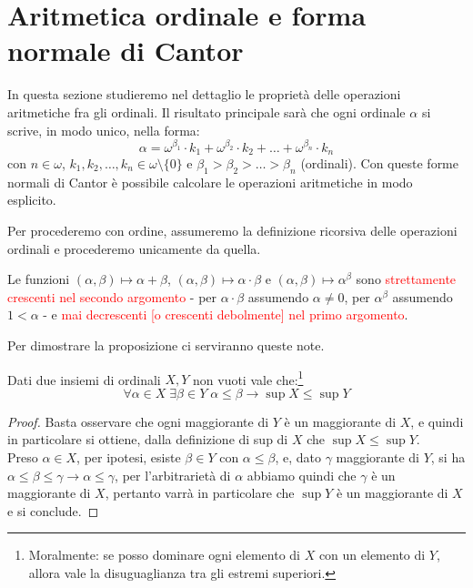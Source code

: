 \section{Aritmetica ordinale e forma normale di Cantor}
In questa sezione studieremo nel dettaglio le proprietà delle operazioni aritmetiche fra gli ordinali. Il risultato principale sarà che ogni ordinale $\alpha$ si scrive, in modo unico, nella forma:
\[ \alpha = \omega^{\beta_1}\cdot k_1 + \omega^{\beta_2}\cdot k_2 + \ldots + \omega^{\beta_n}\cdot k_n
	\]
con $n \in \omega$, $k_1,k_2,\ldots,k_n \in \omega\setminus\{0\}$ e $\beta_1 > \beta_2 > \ldots > \beta_n$ (ordinali). Con queste forme normali di Cantor è possibile calcolare le operazioni aritmetiche in modo esplicito.

\begin{note}
	Per procederemo con ordine, assumeremo la definizione ricorsiva delle operazioni ordinali e procederemo unicamente da quella.
\end{note}

\begin{proposition}
	Le funzioni $(\alpha,\beta)\mapsto \alpha + \beta$, $(\alpha,\beta) \mapsto \alpha \cdot \beta$ e $(\alpha,\beta) \mapsto \alpha^\beta$ sono \textcolor{red}{strettamente crescenti nel secondo argomento} - per $\alpha \cdot \beta$ assumendo $\alpha \ne 0$,
	per $\alpha^\beta$ assumendo $1<\alpha$ - e \textcolor{red}{mai decrescenti [o crescenti debolmente] nel primo argomento}.
\end{proposition}

Per dimostrare la proposizione ci serviranno queste note.

\begin{note}
	Dati due insiemi di ordinali $X,Y$ non vuoti vale che:\footnote{Moralmente: se posso dominare ogni elemento di $X$ con un elemento di $Y$, allora vale la disuguaglianza tra gli estremi superiori.}
	\[ \forall \alpha \in X \; \exists \beta \in Y \; \alpha \leq \beta \rightarrow \sup X \leq \sup Y
		\]
\end{note}

\begin{proof}
	Basta osservare che ogni maggiorante di $Y$ è un maggiorante di $X$, e quindi in particolare si ottiene, dalla definizione di sup di $X$ che $\sup X \leq \sup Y$.\\
	Preso $\alpha \in X$, per ipotesi, esiste $\beta \in Y$ con $\alpha \leq \beta$, e, dato $\gamma$ maggiorante di $Y$, si ha $\alpha \leq \beta \leq \gamma \to \alpha \leq \gamma$,
	per l'arbitrarietà di $\alpha$ abbiamo quindi che $\gamma$ è un maggiorante di $X$, pertanto varrà in particolare che $\sup Y$ è un maggiorante di $X$ e si conclude.
\end{proof}

